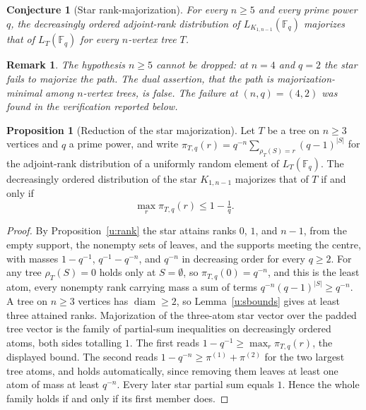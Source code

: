 \documentclass[11pt]{article}
\newtheorem{conjecture}{Conjecture}
\newtheorem{remark}{Remark}
\theoremstyle{definition}
\newcommand{\Fq}{\mathbb F}
\newtheorem{proposition}{Proposition}
\begin{document}
\begin{conjecture}[Star rank-majorization]\label{u17}
For every $n\ge5$ and every prime power $q$, the decreasingly ordered adjoint-rank distribution of $L_{K_{1,n-1}}(\Fq_q)$ majorizes that of $L_T(\Fq_q)$ for every $n$-vertex tree $T$.
\end{conjecture}

\begin{remark}\label{u17:sharp}
The hypothesis $n\ge5$ cannot be dropped: at $n=4$ and $q=2$ the star fails to majorize the path.  The dual assertion, that the path is majorization-minimal among $n$-vertex trees, is false.  The failure at $(n,q)=(4,2)$ was found in the verification reported below.
\end{remark}

\begin{proposition}[Reduction of the star majorization]\label{u:starmaj}
Let $T$ be a tree on $n\ge3$ vertices and $q$ a prime power, and write $\pi_{T,q}(r)=q^{-n}\sum_{\rho_T(S)=r}(q-1)^{|S|}$ for the adjoint-rank distribution of a uniformly random element of $L_T(\Fq_q)$.  The decreasingly ordered distribution of the star $K_{1,n-1}$ majorizes that of $T$ if and only if
\[
\max_r\pi_{T,q}(r)\le 1-\tfrac1q .
\]
\end{proposition}

\begin{proof}
By Proposition~\ref{u:rank} the star attains ranks $0$, $1$, and $n-1$, from the empty support, the nonempty sets of leaves, and the supports meeting the centre, with masses $1-q^{-1}$, $q^{-1}-q^{-n}$, and $q^{-n}$ in decreasing order for every $q\ge2$.  For any tree $\rho_T(S)=0$ holds only at $S=\emptyset$, so $\pi_{T,q}(0)=q^{-n}$, and this is the least atom, every nonempty rank carrying mass a sum of terms $q^{-n}(q-1)^{|S|}\ge q^{-n}$.  A tree on $n\ge3$ vertices has $\operatorname{diam}\ge2$, so Lemma~\ref{u:sbounds} gives at least three attained ranks.  Majorization of the three-atom star vector over the padded tree vector is the family of partial-sum inequalities on decreasingly ordered atoms, both sides totalling $1$.  The first reads $1-q^{-1}\ge\max_r\pi_{T,q}(r)$, the displayed bound.  The second reads $1-q^{-n}\ge\pi^{(1)}+\pi^{(2)}$ for the two largest tree atoms, and holds automatically, since removing them leaves at least one atom of mass at least $q^{-n}$.  Every later star partial sum equals $1$.  Hence the whole family holds if and only if its first member does.
\end{proof}
\end{document}
